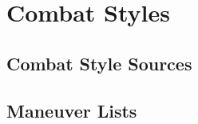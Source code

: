 \chapter{Combat Styles}\label{Combat Styles}

\section{Combat Style Sources}\label{Combat Style Sources}

    

\newpage
\section{Maneuver Lists}\label{Maneuver Lists}

    


